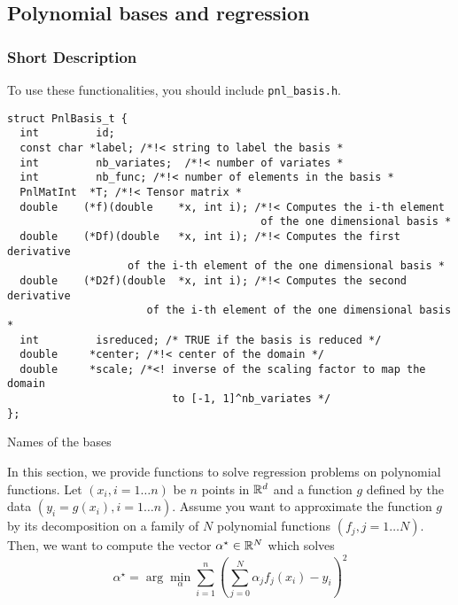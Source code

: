 \subsection{Polynomial bases and regression}
\subsubsection{Short Description}

To use these functionalities, you should include \verb!pnl_basis.h!.

\begin{verbatim}
struct PnlBasis_t {
  int         id;
  const char *label; /*!< string to label the basis *
  int         nb_variates;  /*!< number of variates *
  int         nb_func; /*!< number of elements in the basis *
  PnlMatInt  *T; /*!< Tensor matrix *
  double    (*f)(double    *x, int i); /*!< Computes the i-th element
                                        of the one dimensional basis *
  double    (*Df)(double   *x, int i); /*!< Computes the first derivative
                   of the i-th element of the one dimensional basis *
  double    (*D2f)(double  *x, int i); /*!< Computes the second derivative
                      of the i-th element of the one dimensional basis *
  int         isreduced; /* TRUE if the basis is reduced */
  double     *center; /*!< center of the domain */
  double     *scale; /*<! inverse of the scaling factor to map the domain 
                          to [-1, 1]^nb_variates */
};
\end{verbatim}

\begin{table}[h!]
  \begin{describeconst}
  \end{describeconst}
  \caption{Names of the bases}
  \label{basis_index}
\end{table}

In this section, we provide functions to solve regression problems on
polynomial functions. Let $(x_i, i=1 \dots n)$ be $n$ points in ${\mathbb R}^d$ and a
function $g$ defined by the data $(y_i = g(x_i), i=1 \dots n)$. Assume you
want to approximate the function $g$ by its decomposition on a family of $N$
polynomial functions $(f_j, j=1\dots N)$. Then, we want to compute the vector
$\alpha^\star \in {\mathbb R}^N$ which solves
\begin{equation*} \alpha^\star = \arg\min_\alpha \sum_{i=1}^{n}
  \left(\sum_{j=0}^N \alpha_j f_j(x_i) - y_i\right)^2
\end{equation*}

